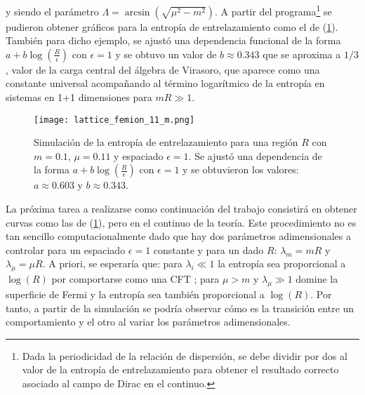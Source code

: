 y siendo el parámetro $\Lambda=\arcsin(\sqrt{\mu^2-m^2})$. A partir del programa\footnote{Dada la periodicidad de la relación de dispersión, se debe dividir por dos al valor de la entropía de entrelazamiento para obtener el resultado correcto asociado al campo de Dirac en el continuo.} se pudieron obtener gráficos para la entropía de entrelazamiento como el de (\ref{fig:EE_1+1}). También para dicho ejemplo, se ajustó una dependencia funcional de la forma $a+b\log(\frac{R}{\epsilon})$ con $\epsilon=1$ y se obtuvo un valor de $b\approx 0.343$ que se aproxima a $1/3$, valor de la carga central del álgebra de Virasoro, que aparece como una constante universal acompañando al término logarítmico de la entropía en sistemas en 1+1 dimensiones para $mR \gg 1$\cite{Casini_2007}. 
\begin{figure}[ht]
    \centering
    \texttt{[image: lattice\_femion\_11\_m.png]}
    \caption{Simulación de la entropía de entrelazamiento para una región $R$ con $m=0.1$, $\mu=0.11$ y espaciado $\epsilon=1$. Se ajustó una dependencia de la forma $a+b\log(\frac{R}{\epsilon})$ con $\epsilon=1$ y se obtuvieron los valores: $a \approx 0.603$ y $b\approx 0.343$.}
    \label{fig:EE_1+1}
\end{figure}

La próxima tarea a realizarse como continuación del trabajo consistirá en obtener curvas como las de (\ref{fig:EE_1+1}), pero en el continuo de la teoría. Este procedimiento no es tan sencillo computacionalmente dado que hay dos parámetros adimensionales a controlar para un espaciado $\epsilon=1$ constante y para un dado $R$: $\lambda_m=m R$ y $\lambda_{\mu}=\mu R$. A priori, se esperaría que: para $\lambda_i \ll 1$ la entropía sea proporcional a $\log(R)$ por comportarse como una CFT \cite{Casini:2009sr}; para $\mu > m$ y $\lambda_{\mu} \gg 1$ domine la superficie de Fermi y la entropía sea también proporcional a $\log(R)$\cite{Swingle:2014}. Por tanto, a partir de la simulación se podría observar cómo es la transición entre un comportamiento y el otro al variar los parámetros adimensionales.
